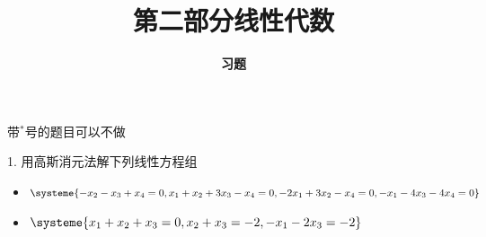



\title[Linear Algebra]{\LARGE \bfseries 第二部分\quad 线性代数} %
\author[Exercises] %
{\Large \bfseries 习题}
\date{}





\begin{frame}

\titlepage %

\end{frame}





\begin{frame}

{\color{red} \scriptsize 带$^*$号的题目可以不做}

\vspace{1em}

1. 用高斯消元法解下列线性方程组
\begin{itemize}
\item[(1)] $\displaystyle \systeme{-x_2 -x_3 + x_4 = 0, x_1 + x_2 + 3x_3 - x_4 = 0, -2x_1 + 3x_2 - x_4 = 0, -x_1 - 4x_3 - 4x_4 = 0}$
\item[(2)] $\displaystyle \systeme{x_1 + x_2 + x_3 = 0, x_2 + x_3 = -2, -x_1 - 2x_3 = -2}$
\end{itemize}

\end{frame}

